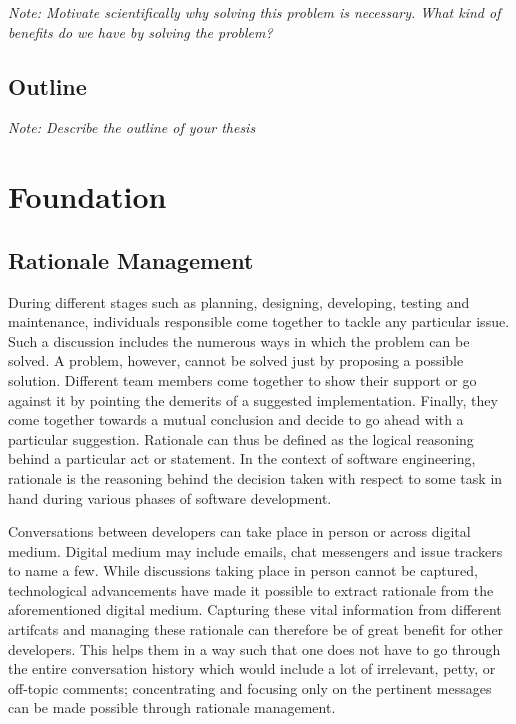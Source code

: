 \documentclass[a4paper,12pt,twoside]{report}
\begin{document}
\textit{Note: Motivate scientifically why solving this problem is necessary. What kind of benefits do we have by solving the problem?}

\section{Outline}

\textit{Note: Describe the outline of your thesis}




\chapter{Foundation}

\section{Rationale Management}

During different stages such as planning, designing, developing, testing and maintenance, individuals responsible come together to tackle any particular issue. Such a discussion includes the numerous ways in which the problem can be solved. A problem, however, cannot be solved just by proposing a possible solution. Different team members come together to show their support or go against it by pointing the demerits of a suggested implementation. Finally, they come together towards a mutual conclusion and decide to go ahead with a particular suggestion. Rationale can thus be defined as the logical reasoning behind a particular act or statement. In the context of software engineering, rationale is the reasoning behind the decision taken with respect to some task in hand during various phases of software development. 

Conversations between developers can take place in person or across digital medium. Digital medium may include emails, chat messengers and issue trackers to name a few. While discussions taking place in person cannot be captured, technological advancements have made it possible to extract rationale from the aforementioned digital medium. Capturing these vital information from different artifcats and managing these rationale can therefore be of great benefit for other developers. This helps them in a way such that one does not have to go through the entire conversation history which would include a lot of irrelevant, petty, or off-topic comments; concentrating and focusing only on the pertinent messages can be made possible through rationale management. 
\end{document}

